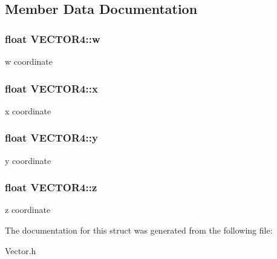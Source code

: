 \subsection{Member Data Documentation}
\hypertarget{struct_v_e_c_t_o_r4_a9baf0e6a42e3fb90572a1fb238c28403}{
\subsubsection[{w}]{\setlength{\rightskip}{0pt plus 5cm}float {\bf VECTOR4::w}}}
\label{struct_v_e_c_t_o_r4_a9baf0e6a42e3fb90572a1fb238c28403}
w coordinate \hypertarget{struct_v_e_c_t_o_r4_ae1b2a9e4f7c5b97bb249dc3be2db47b5}{
\subsubsection[{x}]{\setlength{\rightskip}{0pt plus 5cm}float {\bf VECTOR4::x}}}
\label{struct_v_e_c_t_o_r4_ae1b2a9e4f7c5b97bb249dc3be2db47b5}
x coordinate \hypertarget{struct_v_e_c_t_o_r4_a0c5ad126135db794c5691cbda1589660}{
\subsubsection[{y}]{\setlength{\rightskip}{0pt plus 5cm}float {\bf VECTOR4::y}}}
\label{struct_v_e_c_t_o_r4_a0c5ad126135db794c5691cbda1589660}
y coordinate \hypertarget{struct_v_e_c_t_o_r4_af1efc5d779733aafc317cb3166f6146b}{
\subsubsection[{z}]{\setlength{\rightskip}{0pt plus 5cm}float {\bf VECTOR4::z}}}
\label{struct_v_e_c_t_o_r4_af1efc5d779733aafc317cb3166f6146b}
z coordinate 

The documentation for this struct was generated from the following file:\begin{DoxyCompactItemize}
\item 
Vector.h\end{DoxyCompactItemize}
